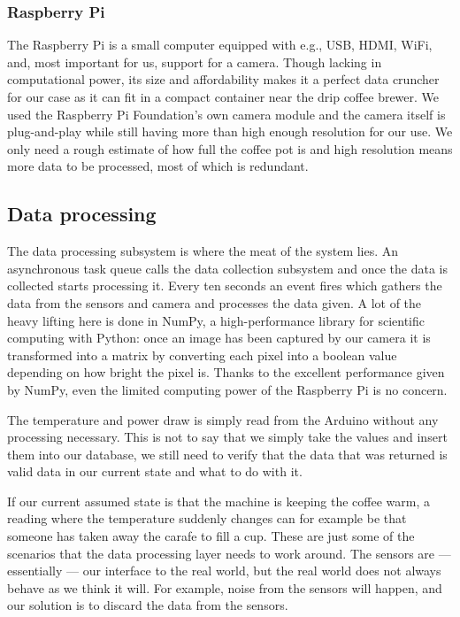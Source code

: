 \documentclass[12pt,a4paper,oneside,article]{memoir}
\numberwithin{equation}{chapter}
\begin{document}
\subsubsection{Raspberry Pi}\label{sec:raspberry-pi}
The Raspberry Pi is a small computer equipped with e.g., USB, HDMI, WiFi, 
and, most important for us, support for a camera. Though lacking in 
computational power, its size and affordability makes it a perfect data 
cruncher for our case as it can fit in a compact container near the drip 
coffee brewer. We used the Raspberry Pi Foundation's own camera module and the 
camera itself is plug-and-play while still having more than high enough 
resolution for our use. We only need a rough estimate of how full the coffee pot 
is and high resolution means more data to be processed, most of which is 
redundant.

\subsection{Data processing}\label{sec:data-processing}
The data processing subsystem is where the meat of the system lies. An 
asynchronous task queue calls the data collection subsystem and once the data is
collected starts processing it. Every ten seconds an event fires which gathers
the data from the sensors and camera and processes the data given. A lot of the
heavy lifting here is done in NumPy, a high-performance library for scientific
computing with Python: once an image has been captured by our camera it is
transformed into a matrix by converting each pixel into a boolean value
depending on how bright the pixel is. Thanks to the excellent performance given
by NumPy, even the limited computing power of the Raspberry Pi is no concern.

The temperature and power draw is simply read from the Arduino without any
processing necessary. This is not to say that we simply take the values and
insert them into our database, we still need to verify that the data that was
returned is valid data in our current state and what to do with it.

If our current assumed state is that the machine is keeping the coffee warm, a
reading where the temperature suddenly changes can for example be that someone
has taken away the carafe to fill a cup. These are just some of the scenarios
that the data processing layer needs to work around. The sensors are ---
essentially --- our interface to the real world, but the real world does not 
always behave as we think it will. For example, noise from the sensors will 
happen, and our solution is to discard the data from the sensors.
\end{document}
